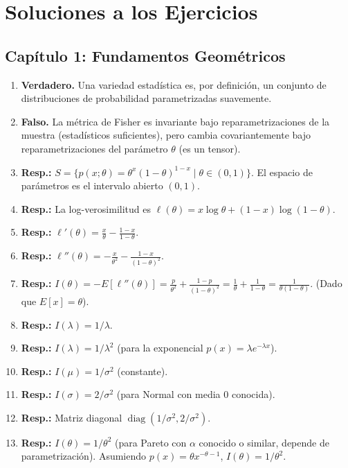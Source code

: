 \appendix
\chapter{Soluciones a los Ejercicios}

\section*{Capítulo 1: Fundamentos Geométricos}

\begin{enumerate}
	\item \textbf{Verdadero.} Una variedad estadística es, por definición, un conjunto de distribuciones de probabilidad parametrizadas suavemente.
	\item \textbf{Falso.} La métrica de Fisher es invariante bajo reparametrizaciones de la muestra (estadísticos suficientes), pero cambia covariantemente bajo reparametrizaciones del parámetro $\theta$ (es un tensor).
	\item \textbf{Resp.:} $S = \{ p(x;\theta) = \theta^x (1-\theta)^{1-x} \mid \theta \in (0,1) \}$. El espacio de parámetros es el intervalo abierto $(0,1)$.
	\item \textbf{Resp.:} La log-verosimilitud es $\ell(\theta) = x\log\theta + (1-x)\log(1-\theta)$.
	\item \textbf{Resp.:} $\ell'(\theta) = \frac{x}{\theta} - \frac{1-x}{1-\theta}$.
	\item \textbf{Resp.:} $\ell''(\theta) = -\frac{x}{\theta^2} - \frac{1-x}{(1-\theta)^2}$.
	\item \textbf{Resp.:} $I(\theta) = -E[\ell''(\theta)] = \frac{p}{\theta^2} + \frac{1-p}{(1-\theta)^2} = \frac{1}{\theta} + \frac{1}{1-\theta} = \frac{1}{\theta(1-\theta)}$. (Dado que $E[x]=\theta$).
	\item \textbf{Resp.:} $I(\lambda) = 1/\lambda$.
	\item \textbf{Resp.:} $I(\lambda) = 1/\lambda^2$ (para la exponencial $p(x)=\lambda e^{-\lambda x}$).
	\item \textbf{Resp.:} $I(\mu) = 1/\sigma^2$ (constante).
	\item \textbf{Resp.:} $I(\sigma) = 2/\sigma^2$ (para Normal con media 0 conocida).
	\item \textbf{Resp.:} Matriz diagonal $\operatorname{diag}(1/\sigma^2, 2/\sigma^2)$.
	\item \textbf{Resp.:} $I(\theta) = 1/\theta^2$ (para Pareto con $\alpha$ conocido o similar, depende de parametrización). Asumiendo $p(x)=\theta x^{-\theta-1}$, $I(\theta)=1/\theta^2$.

\end{enumerate}
